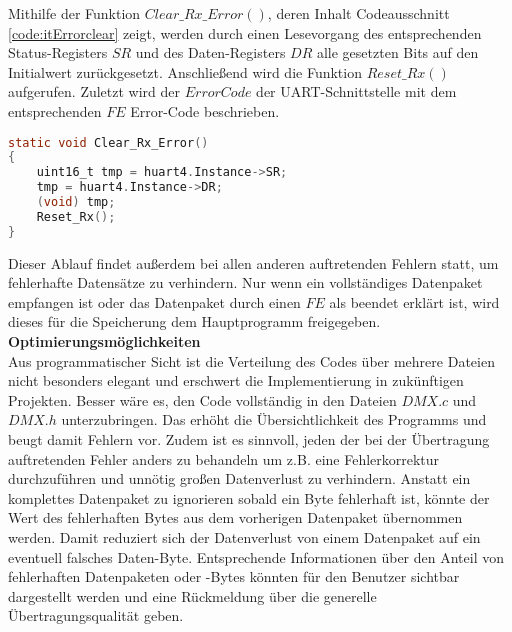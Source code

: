 Mithilfe der Funktion $Clear\_Rx\_Error()$, deren Inhalt Codeausschnitt \ref{code:itErrorclear} zeigt, werden durch einen Lesevorgang des entsprechenden Status-Registers $SR$ und des Daten-Registers $DR$ alle gesetzten Bits auf den Initialwert zurückgesetzt. Anschließend wird die Funktion $Reset\_Rx()$ aufgerufen. Zuletzt wird der $ErrorCode$ der UART-Schnittstelle mit dem entsprechenden $FE$ Error-Code beschrieben. 
\begin{lstlisting}[caption = stm32f4xx\_it.c: UART Clear\_Rx\_Error(),
	label = code:itErrorclear, 
	language = C, 
	firstnumber = 426]
static void Clear_Rx_Error()
{
	uint16_t tmp = huart4.Instance->SR;
	tmp = huart4.Instance->DR;
	(void) tmp;
	Reset_Rx();
}
\end{lstlisting}
Dieser Ablauf findet außerdem bei allen anderen auftretenden Fehlern statt, um fehlerhafte Datensätze zu verhindern. Nur wenn ein vollständiges Datenpaket empfangen ist oder das Datenpaket durch einen $FE$ als beendet erklärt ist, wird dieses für die Speicherung dem Hauptprogramm freigegeben.\\
\newline
\textbf{Optimierungsmöglichkeiten}\\
Aus programmatischer Sicht ist die Verteilung des Codes über mehrere Dateien nicht besonders elegant und erschwert die Implementierung in zukünftigen Projekten. Besser wäre es, den Code vollständig in den Dateien $DMX.c$ und $DMX.h$ unterzubringen. Das erhöht die Übersichtlichkeit des Programms und beugt damit Fehlern vor. Zudem ist es sinnvoll, jeden der bei der Übertragung auftretenden Fehler anders zu behandeln um z.B. eine Fehlerkorrektur durchzuführen und unnötig großen Datenverlust zu verhindern. Anstatt ein komplettes Datenpaket zu ignorieren sobald ein Byte fehlerhaft ist, könnte der Wert des fehlerhaften Bytes aus dem vorherigen Datenpaket übernommen werden. Damit reduziert sich der Datenverlust von einem Datenpaket auf ein eventuell falsches Daten-Byte. Entsprechende Informationen über den Anteil von fehlerhaften Datenpaketen oder -Bytes könnten für den Benutzer sichtbar dargestellt werden und eine Rückmeldung über die generelle Übertragungsqualität geben.